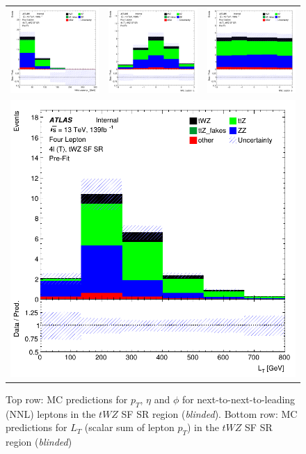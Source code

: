 \begin{figure}[htbp]
  \centering
  \begin{tabular}{ccc}



    \includegraphics[width=.2\textwidth]{figures/PreFitPlots/lep4_tWZ_4T_SF_NNL_lepton_pt} &
    \includegraphics[width=.2\textwidth]{figures/PreFitPlots/lep4_tWZ_4T_SF_NNL_lepton_eta} &
    \includegraphics[width=.2\textwidth]{figures/PreFitPlots/lep4_tWZ_4T_SF_NNL_lepton_phi} \\
    \multicolumn{3}{c}{\includegraphics[width=.2\textwidth]{figures/PreFitPlots/lep4_tWZ_4T_SF_LT} }\\

  \end{tabular}
  \caption{Top row: MC predictions for $p_{T}$, $\eta$ and $\phi$ for next-to-next-to-leading (NNL) leptons in the $tWZ$ SF SR region (\textit{blinded}). Bottom row: MC predictions for $L_{T}$ (scalar sum of lepton $p_{T}$)  in the $tWZ$ SF SR region (\textit{blinded})}
  \label{fig:4lep-SF-SR-leptonPlots}
\end{figure}


